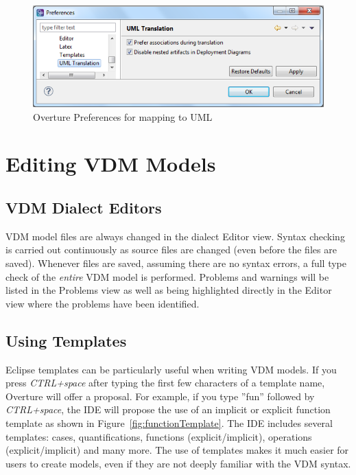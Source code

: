 \documentclass{overturerepchap}
\begin{document}
\begin{figure}[!hbt]
\begin{center}
  \includegraphics[width=\textwidth]{screenDumps/UMLpreferences}
  \caption{Overture Preferences for mapping to UML}
  \label{fig:UMLpreferences}
\end{center}
\end{figure}

\chapter{Editing VDM Models}\label{sec:editVDM}

\section{VDM Dialect Editors}

VDM model files are always changed in the dialect Editor view. Syntax checking
is carried out continuously as source files are
changed (even before the files are saved). Whenever files are saved, assuming
there are no syntax errors, a full type check of the \emph{entire} VDM model is
performed.
Problems and warnings will be listed in the Problems view as well as
being highlighted directly in the Editor view where the problems have been
identified.


\section{Using Templates}\label{sec:templates}

Eclipse templates can be particularly useful when writing VDM models. If you
press \textit{CTRL+space} after typing the first few characters of a template name,
Overture will offer a proposal. For example, if you type ''fun'' followed
by \textit{CTRL+space}, the IDE will propose the use of an implicit or explicit
function template as shown in Figure~\ref{fig:functionTemplate}. The IDE includes
several templates: cases, quantifications, functions (explicit/implicit),
operations (explicit/implicit) and many more. The use of templates makes it much
easier for users to create models, even if they are not deeply familiar
with the VDM syntax.
\end{document}
